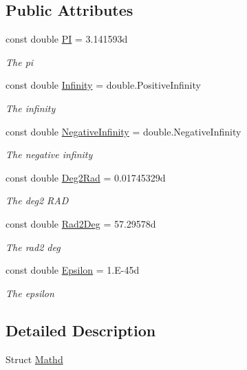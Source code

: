 \subsection*{Public Attributes}
\begin{DoxyCompactItemize}
\item 
const double \hyperlink{struct_unity_engine_1_1_mathd_ab807c2e936b0f875f4129b7a1471cce3}{PI} = 3.\+141593d
\begin{DoxyCompactList}\small\item\em The pi \end{DoxyCompactList}\item 
const double \hyperlink{struct_unity_engine_1_1_mathd_a9cf3a3661fc7efe4717a5e984257c1ec}{Infinity} = double.\+Positive\+Infinity
\begin{DoxyCompactList}\small\item\em The infinity \end{DoxyCompactList}\item 
const double \hyperlink{struct_unity_engine_1_1_mathd_aaf01677761267c23a62df97cf207775c}{Negative\+Infinity} = double.\+Negative\+Infinity
\begin{DoxyCompactList}\small\item\em The negative infinity \end{DoxyCompactList}\item 
const double \hyperlink{struct_unity_engine_1_1_mathd_a3f3ab33892762fce4328128bfecc68cc}{Deg2\+Rad} = 0.\+01745329d
\begin{DoxyCompactList}\small\item\em The deg2 R\+AD \end{DoxyCompactList}\item 
const double \hyperlink{struct_unity_engine_1_1_mathd_a7d2eb5795fdcf10c75d24e1485b23498}{Rad2\+Deg} = 57.\+29578d
\begin{DoxyCompactList}\small\item\em The rad2 deg \end{DoxyCompactList}\item 
const double \hyperlink{struct_unity_engine_1_1_mathd_ac91c44549b7f3ea9d99c68bbe53abe98}{Epsilon} = 1.\+E-\/45d
\begin{DoxyCompactList}\small\item\em The epsilon \end{DoxyCompactList}\end{DoxyCompactItemize}


\subsection{Detailed Description}
Struct \hyperlink{struct_unity_engine_1_1_mathd}{Mathd} 



